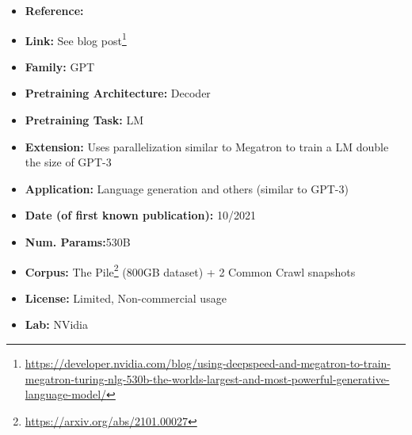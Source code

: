 \documentclass{article}
\begin{document}
            \begin{itemize}
                \item \textbf{Reference:} 
                \item \textbf{Link:} See blog post\footnote{\url{https://developer.nvidia.com/blog/using-deepspeed-and-megatron-to-train-megatron-turing-nlg-530b-the-worlds-largest-and-most-powerful-generative-language-model/}}
                \item \textbf{Family:} GPT 
                \item \textbf{Pretraining Architecture:} Decoder
                \item \textbf{Pretraining Task:} LM
                \item \textbf{Extension:} Uses parallelization similar to Megatron to train a LM double the size of GPT-3  
                \item \textbf{Application:} Language generation and others (similar to GPT-3)
                \item \textbf{Date (of first known publication):} 10/2021
                \item \textbf{Num. Params:}530B
                \item \textbf{Corpus:} The Pile\footnote{\url{https://arxiv.org/abs/2101.00027}} (800GB dataset) + 2 Common Crawl snapshots
                \item \textbf{License:} Limited, Non-commercial usage
                \item \textbf{Lab:} NVidia
            \end{itemize}

\end{document}
